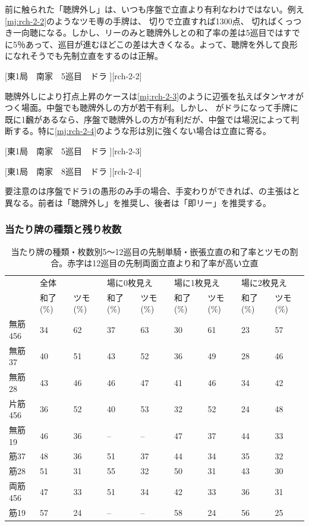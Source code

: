 \documentclass[10pt, twocolumn]{article}
\begin{document}
前に触られた「聴牌外し」は、いつも序盤で立直より有利なわけではない。例え\ref{mj:rch-2-2}のようなツモ専の手牌は、 切りで立直すれば1300点、 切ればくっつき一向聴になる。しかし、リーのみと聴牌外しとの和了率の差は5巡目ではすでに5％あって、巡目が進むほどこの差は大きくなる\citep[][p. 34]{miinin-stat}。よって、聴牌を外して良形になれそうでも先制立直をするのは正解。

[東1局　南家　5巡目　ドラ ][rch-2-2]

聴牌外しにより打点上昇のケースは\ref{mj:rch-2-3}のように辺張を払えばタンヤオがつく場面。中盤でも聴牌外しの方が若干有利\citep[][p. 35]{miinin-stat}。しかし、 がドラになって手牌に既に1飜があるなら、序盤で聴牌外しの方が有利だが、中盤では場況によって判断する。特に\ref{mj:rch-2-4}のような形は別に強くない場合は立直に寄る。

[東1局　南家　5巡目　ドラ ][rch-2-3]

[東1局　南家　8巡目　ドラ ][rch-2-4]

要注意のは序盤でドラ1の愚形のみ手の場合、手変わりができれば、\citet[p. 35]{miinin-stat}の主張は\citet[p. 165]{rb1}と異なる。前者は「聴牌外し」を推奨し、後者は「即リー」を推奨する。

\subsubsection*{当たり牌の種類と残り枚数} 

\begin{table}[t]
  \centering
  \begin{tabular}{l|llllllll}
               & \multicolumn{2}{l}{全体} & \multicolumn{2}{l}{場に0枚見え} & \multicolumn{2}{l}{場に1枚見え} & \multicolumn{2}{l}{場に2枚見え} \\
               & 和了 (\%) & ツモ (\%) & 和了 (\%) & ツモ (\%) & 和了 (\%) & ツモ (\%) & 和了 (\%) & ツモ (\%) \\
    \hline
    無筋456 & 34 & 62 & 37 & 63 & 30 & 61 & 23 & 57 \\
    無筋37  & 40 & 51 & 43 & 52 & 36 & 49 & 28 & 46 \\
    無筋28  & 43 & 46 & 46 & 47 & 41 & 46 & 34 & 42 \\
    片筋456 & 36 & 52 & 40 & 53 & 32 & 52 & 24 & 48 \\
    無筋19  & 46 & 36 & -- & -- & 47 & 37 & {\color{red}44} & 33 \\
    筋37    & 48 & 36 & 51 & 37 & 44 & 34 & 35 & 32 \\
    筋28    & 51 & 31 & 55 & 32 & 50 & 31 & {\color{red}43} & 30 \\
    両筋456 & 47 & 33 & 51 & 34 & 42 & 33 & 36 & 31 \\
    筋19    & 57 & 24 & -- & -- & 58 & 24 & {\color{red}56} & 25
  \end{tabular}
  \caption{当たり牌の種類・枚数別5〜12巡目の先制単騎・嵌張立直の和了率とツモの割合\citep[][p. 38]{miinin-stat}。赤字は12巡目の先制両面立直より和了率が高い立直}
  \label{tab:ev-gukei-riichi-machi}
\end{table}
\end{document}
